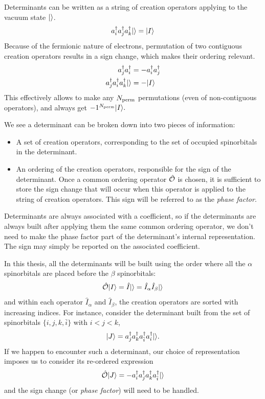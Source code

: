 \documentclass[./thesis.tex]{subfiles}
\begin{document}
Determinants can be written as a string of creation operators applying to the vacuum state ${\ket{}}$.
\begin{equation}
a^\dagger_{i} a^\dagger_{j} a^\dagger_{k} {\ket{}} = {\ket{I}}
\end{equation}
Because of the fermionic nature of electrons, permutation of two contiguous creation operators results in a sign change, which makes their ordering relevant.
\begin{align}
a^\dagger_{j} a^\dagger_{i} & = -a^\dagger_{i} a^\dagger_{j} \\
a^\dagger_{j} a^\dagger_{i} a^\dagger_{k} {\ket{}} &=  -{\ket{I}}
\end{align}
This effectively allows to make any ${N_\text{perm}}$ permutations (even of non-contiguous operators), and always get $-1^{{N_\text{perm}}} {\ket{I}}.$

We see a determinant can be broken down into two pieces of information:
\begin{itemize}
\item
A set of creation operators, corresponding to the set of occupied spinorbitals in the determinant.
\item
An ordering of the creation operators, responsible for the sign of the determinant. Once a common ordering operator ${\hat{\mathcal{O}}}$ is chosen, it is sufficient to store the sign change that will occur when this operator is applied to the string of creation operators. This sign will be referred to as the \emph{phase factor}.
\end{itemize}
Determinants are always associated with a coefficient, so
if the determinants are always built after applying them the same common ordering operator,
we don't need to make the phase factor part of the determinant's internal representation. The sign may simply be reported on the associated coefficient.

In this thesis, all the determinants will be built using the order where all the $\alpha$ spinorbitals are placed before the $\beta$ spinorbitals:
\begin{equation}
\label{eq:spinpack}
{\hat{\mathcal{O}}} {\ket{I}} = \hat{I} {\ket{}} = \hat{I}_\alpha \hat{I}_\beta {\ket{}} 
\end{equation}
and within each operator $\hat{I}_\alpha$ and $\hat{I}_\beta$, the creation operators are sorted with increasing indices.
For instance, consider the determinant built from the set of spinorbitals $\{i,j,k,{\bar i} \}$ with $i<j<k$,
\begin{equation}
{\ket{J}} = a^\dagger_{j} a^\dagger_{k} a^\dagger_{\bar i} a^\dagger_{i} {\ket{}}.
\end{equation}
If we happen to encounter such a determinant, our choice of representation imposes us to consider its re-ordered expression
\begin{equation}
{\hat{\mathcal{O}}} {\ket{J}} = - a^\dagger_{i} a^\dagger_{j} a^\dagger_{k} a^\dagger_{\bar i} {\ket{}} 
\end{equation}
and the sign change (or \emph{phase factor}) will need to be handled.
\end{document}
